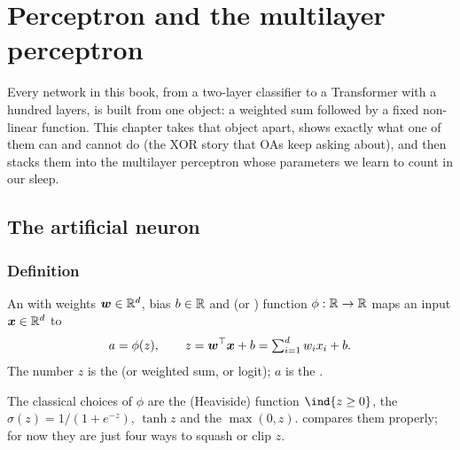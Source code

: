 \chapter{Perceptron and the multilayer perceptron}
\label{ch:perceptron}

Every network in this book, from a two-layer classifier to a Transformer with a
hundred layers, is built from one object: a weighted sum followed by a fixed
non-linear function. This chapter takes that object apart, shows exactly what one
of them can and cannot do (the XOR story that OAs keep asking about), and then
stacks them into the multilayer perceptron whose parameters we learn to count
in our sleep.

\section{The artificial neuron}

\subsection{Definition}
\begin{definition}
	An  with weights ${\bm{w}}\in\mathbb R^d$, bias $b\in\mathbb R$ and
	 (or ) function $\phi:\mathbb R\to\mathbb R$ maps an
	input ${\bm{x}}\in\mathbb R^d$ to
	\[ a = \phi(z), \qquad z = {\bm{w}}^{\top}{\bm{x}} + b = \textstyle\sum_{i=1}^d w_i x_i + b. \]
	The number $z$ is the  (or weighted sum, or logit);
	$a$ is the .
\end{definition}

The classical choices of $\phi$ are the  (Heaviside) function
$\ind{z\ge 0}$, the  $\sigma(z)=1/(1+e^{-z})$, $\tanh z$ and the
 $\max(0,z)$.  compares them properly; for now
they are just four ways to squash or clip $z$.

\begin{center}
\end{center}

